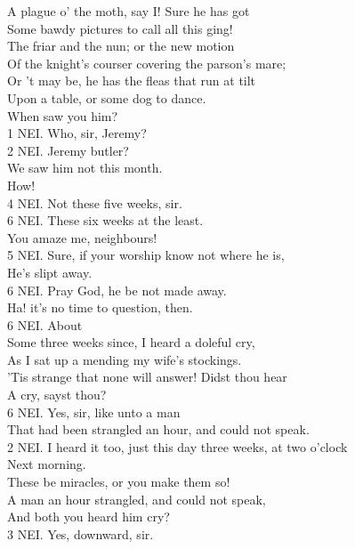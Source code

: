\documentclass{memoir}
\begin{document}
\begin{drama*}
 A plague o' the moth, say I! Sure he has got\\
 Some bawdy pictures to call all this ging!\\
 The friar and the nun; or the new motion\\
 Of the knight's courser covering the parson's mare;\\
 Or 't may be, he has the fleas that run at tilt\\
 Upon a table, or some dog to dance.\\
 When saw you him?\\
1 NEI. Who, sir, Jeremy?\\
2 NEI. Jeremy butler?\\
 We saw him not this month.\\
\lovewitspeaks {} How!\\
4 NEI. Not these five weeks, sir.\\
6 NEI. These six weeks at the least.\\
\lovewitspeaks {} You amaze me, neighbours!\\
5 NEI. Sure, if your worship know not where he is,\\
 He's slipt away.\\
6 NEI. Pray God, he be not made away.\\
\lovewitspeaks {} Ha! it's no time to question, then.\\
6 NEI. About\\
 Some three weeks since, I heard a doleful cry,\\
 As I sat up a mending my wife's stockings.\\
\lovewitspeaks  'Tis strange that none will answer! Didst thou hear\\
 A cry, sayst thou?\\
6 NEI. Yes, sir, like unto a man\\
 That had been strangled an hour, and could not speak.\\
2 NEI. I heard it too, just this day three weeks, at two o'clock\\
 Next morning.\\
\lovewitspeaks {} These be miracles, or you make them so!\\
 A man an hour strangled, and could not speak,\\
 And both you heard him cry?\\
3 NEI. Yes, downward, sir.\\

\end{drama*}
\end{document}
